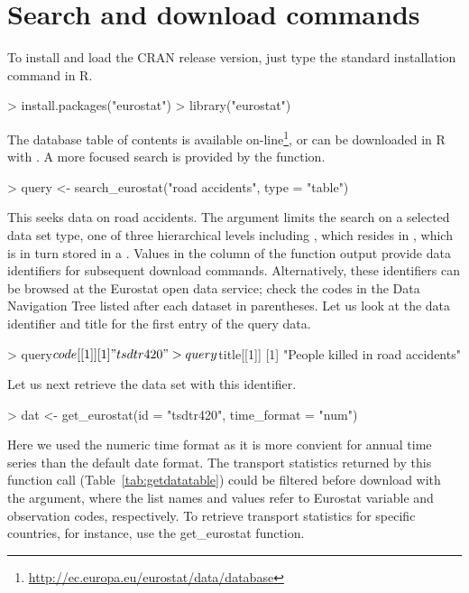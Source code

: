 \section{Search and download commands}

To install and load the CRAN release version, just type the standard installation command in R.

\begin{example}
> install.packages("eurostat")
> library("eurostat")
\end{example}


The database table of contents is available
on-line\footnote{\url{http://ec.europa.eu/eurostat/data/database}}, or can
be downloaded in R with . A more focused
search is provided by the  function.

\begin{example}
> query <- search_eurostat("road accidents", type = "table")
\end{example}

This seeks data on road accidents. The  argument limits the
search on a selected data set type, one of three hierarchical levels
including , which resides in , which is in turn stored in a . Values in the  column of the  function output provide data identifiers for subsequent download commands. Alternatively, these identifiers can be browsed at the Eurostat open data service; check the codes in the Data Navigation Tree listed after each dataset in parentheses. Let us look at the data identifier and title for the first entry of the query data.

\begin{example}
> query$code[[1]]
[1] "tsdtr420"

> query$title[[1]]
[1] "People killed in road accidents"
\end{example}


Let us next retrieve the data set with this identifier.

\begin{example}
> dat <- get_eurostat(id = "tsdtr420", time_format = "num")
\end{example}

Here we used the numeric time format as it is more convient for annual
time series than the default date format. The transport statistics
returned by this function call (Table~\ref{tab:getdatatable}) could be
filtered before download with the  argument, where the
list names and values refer to Eurostat variable and observation
codes, respectively. To retrieve transport statistics for specific
countries, for instance, use the get\_eurostat function.

